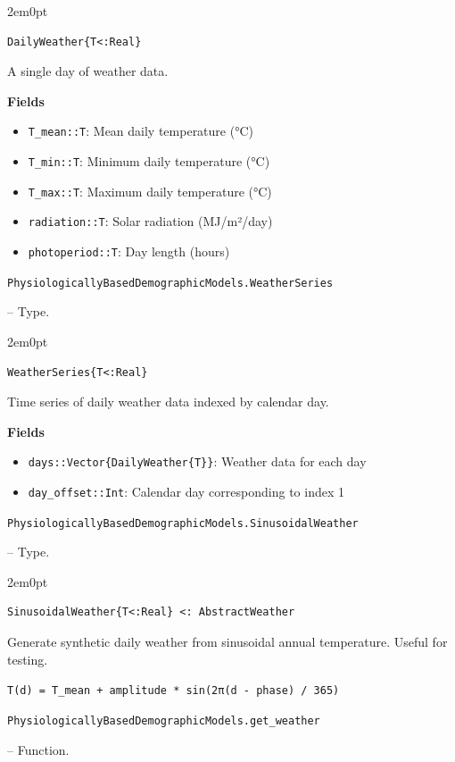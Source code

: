 \begin{adjustwidth}{2em}{0pt}


\begin{verbatim}
DailyWeather{T<:Real}
\end{verbatim}

A single day of weather data.

\textbf{Fields}

\begin{itemize}
\item \texttt{T\_mean::T}: Mean daily temperature (°C)


\item \texttt{T\_min::T}: Minimum daily temperature (°C)


\item \texttt{T\_max::T}: Maximum daily temperature (°C)


\item \texttt{radiation::T}: Solar radiation (MJ/m²/day)


\item \texttt{photoperiod::T}: Day length (hours)

\end{itemize}


\end{adjustwidth}
\hypertarget{13064718740316141449}{\texttt{PhysiologicallyBasedDemographicModels.WeatherSeries}}  -- {Type.}

\begin{adjustwidth}{2em}{0pt}


\begin{verbatim}
WeatherSeries{T<:Real}
\end{verbatim}

Time series of daily weather data indexed by calendar day.

\textbf{Fields}

\begin{itemize}
\item \texttt{days::Vector\{DailyWeather\{T\}\}}: Weather data for each day


\item \texttt{day\_offset::Int}: Calendar day corresponding to index 1

\end{itemize}


\end{adjustwidth}
\hypertarget{9102248571675529677}{\texttt{PhysiologicallyBasedDemographicModels.SinusoidalWeather}}  -- {Type.}

\begin{adjustwidth}{2em}{0pt}


\begin{verbatim}
SinusoidalWeather{T<:Real} <: AbstractWeather
\end{verbatim}

Generate synthetic daily weather from sinusoidal annual temperature. Useful for testing.

\texttt{T(d) = T\_mean + amplitude * sin(2π(d - phase) / 365)}



\end{adjustwidth}
\hypertarget{3632434566751189502}{\texttt{PhysiologicallyBasedDemographicModels.get\_weather}}  -- {Function.}

